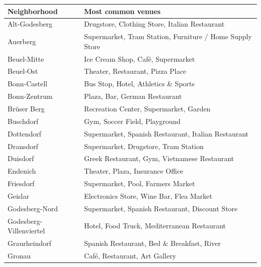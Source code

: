 \documentclass[UKenglish]{scrreprt}
\begin{document}
\begin{table}
	\small
	\caption{Three most common venue categories per neighborhood in Bonn}
	\label{tab:most_common_venues}
\begin{longtable}{ll}
	\toprule
	Neighborhood &                                 Most common venues \\
	\midrule
	Alt-Godesberg                       &    Drugstore, Clothing Store, Italian Restaurant \\
	Auerberg                            &  Supermarket, Tram Station, Furniture / Home Supply Store \\
	Beuel-Mitte                         &                Ice Cream Shop, Café, Supermarket \\
	Beuel-Ost                           &                 Theater, Restaurant, Pizza Place \\
	Bonn-Castell                        &              Bus Stop, Hotel, Athletics \& Sports \\
	Bonn-Zentrum                        &                    Plaza, Bar, German Restaurant \\
	Brüser Berg                         &           Recreation Center, Supermarket, Garden \\
	Buschdorf                           &                    Gym, Soccer Field, Playground \\
	Dottendorf                          &  Supermarket, Spanish Restaurant, Italian Restaurant \\
	Dransdorf                           &             Supermarket, Drugstore, Tram Station \\
	Duisdorf                            &     Greek Restaurant, Gym, Vietnamese Restaurant \\
	Endenich                            &                 Theater, Plaza, Insurance Office \\
	Friesdorf                           &                Supermarket, Pool, Farmers Market \\
	Geislar                             &         Electronics Store, Wine Bar, Flea Market \\
	Godesberg-Nord                      &  Supermarket, Spanish Restaurant, Discount Store \\
	Godesberg-Villenviertel             &      Hotel, Food Truck, Mediterranean Restaurant \\
	Graurheindorf                       &       Spanish Restaurant, Bed \& Breakfast, River \\
	Gronau                              &                    Café, Restaurant, Art Gallery \\

\end{longtable}
\end{table}
\end{document}

